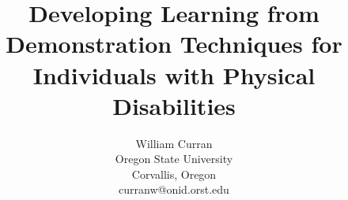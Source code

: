 \documentclass{sig-alternate-2013}
\begin{document}

\title{Developing Learning from Demonstration Techniques for Individuals with Physical Disabilities}


\author{William Curran \\
Oregon State University \\
Corvallis, Oregon \\
curranw@onid.orst.edu \\
}

\maketitle
\end{document}
